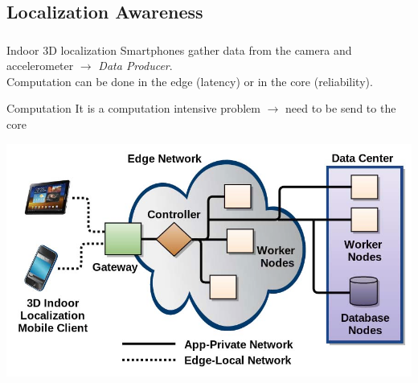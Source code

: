 \documentclass[utf8,xcolor=table, page number]{earlywinter}
\begin{document}
\subsection{Localization Awareness}
\begin{frame}
  \frametitle{\secname}
  \framesubtitle{\subsecname}

  \begin{exampleblock}{Indoor 3D localization}
    Smartphones gather data from the camera and accelerometer $\to$ \emph{Data Producer}.\\
    Computation can be done in the edge (latency) or in the core (reliability).
  \end{exampleblock}

  \begin{minipage}[l]{0.3\linewidth}
    \begin{exampleblock}{Computation}
      It is a computation intensive problem $\to$ need to be send to the core
    \end{exampleblock}
  \end{minipage}
  \begin{minipage}[l]{0.65\linewidth}
  \begin{center}
  \includegraphics[scale=0.2]{indoor}
  \end{center}
  \end{minipage}

\end{frame}
\end{document}
